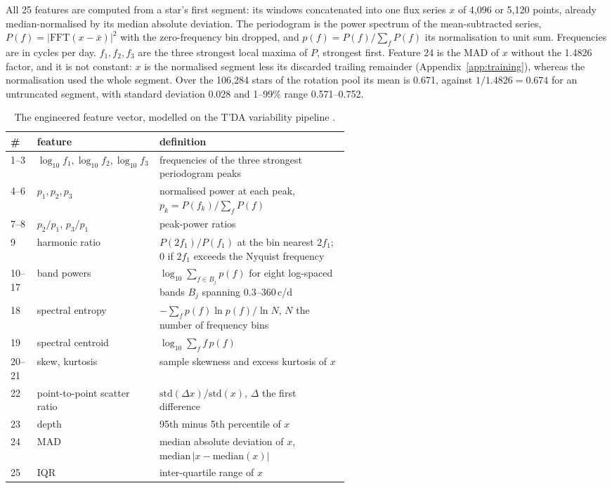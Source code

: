 \documentclass{article}
\begin{document}
All 25 features are computed from a star's first segment: its windows concatenated into one flux
series $x$ of 4{,}096 or 5{,}120 points, already median-normalised by its median absolute
deviation. The periodogram is the power spectrum of the mean-subtracted series,
$P(f) = |\mathrm{FFT}(x - \bar{x})|^{2}$ with the zero-frequency bin dropped, and
$p(f) = P(f)/\sum_f P(f)$ its normalisation to unit sum. Frequencies are in cycles per day.
$f_{1}, f_{2}, f_{3}$ are the three strongest local maxima of $P$, strongest first.
Feature 24 is the MAD of $x$ without the 1.4826 factor, and it is not constant: $x$ is the
normalised segment less its discarded trailing remainder (Appendix~\ref{app:training}), whereas the
normalisation used the whole segment. Over the 106{,}284 stars of the rotation pool its mean is
0.671, against $1/1.4826 = 0.674$ for an untruncated segment, with standard deviation 0.028 and
1--99\% range 0.571--0.752.

\begin{table}[H]
\caption{The engineered feature vector, modelled on the T'DA variability pipeline \citep{audenaert2021}.}
\label{tab:features}
\centering
\small
\begin{tabular}{llp{0.56\linewidth}}
\toprule
\# & feature & definition \\
\midrule
1--3 & $\log_{10} f_{1}, \log_{10} f_{2}, \log_{10} f_{3}$ & frequencies of the three strongest periodogram peaks \\
4--6 & $p_{1}, p_{2}, p_{3}$ & normalised power at each peak, $p_{k} = P(f_{k})/\sum_f P(f)$ \\
7--8 & $p_{2}/p_{1}$, $p_{3}/p_{1}$ & peak-power ratios \\
9 & harmonic ratio & $P(2f_{1})/P(f_{1})$ at the bin nearest $2f_{1}$; $0$ if $2f_{1}$ exceeds the Nyquist frequency \\
10--17 & band powers & $\log_{10} \sum_{f \in B_{j}} p(f)$ for eight log-spaced bands $B_{j}$ spanning 0.3--360\,c/d \\
18 & spectral entropy & $-\sum_f p(f)\ln p(f) / \ln N$, $N$ the number of frequency bins \\
19 & spectral centroid & $\log_{10} \sum_f f\,p(f)$ \\
20--21 & skew, kurtosis & sample skewness and excess kurtosis of $x$ \\
22 & point-to-point scatter ratio & $\mathrm{std}(\Delta x)/\mathrm{std}(x)$, $\Delta$ the first difference \\
23 & depth & 95th minus 5th percentile of $x$ \\
24 & MAD & median absolute deviation of $x$, $\mathrm{median}\,|x - \mathrm{median}(x)|$ \\
25 & IQR & inter-quartile range of $x$ \\
\bottomrule
\end{tabular}
\end{table}
\end{document}
